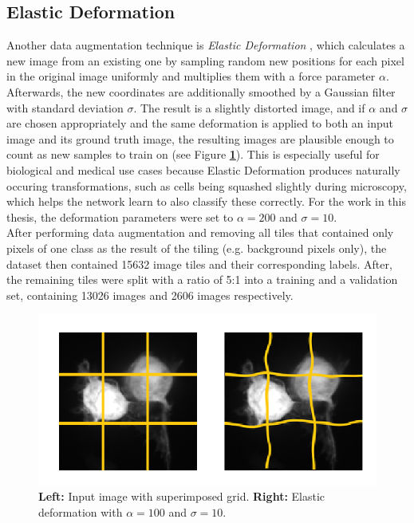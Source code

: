 		\subsection{Elastic Deformation}
Another data augmentation technique is \textit{Elastic Deformation} \cite{elastic}, which calculates a new image from an existing one by sampling random new positions for each pixel in the original image uniformly and multiplies them with a force parameter $\alpha$. Afterwards, the new coordinates are additionally smoothed by a Gaussian filter with standard deviation $\sigma$. The result is a slightly distorted image, and if $\alpha$ and $\sigma$ are chosen appropriately and the same deformation is applied to both an input image and its ground truth image, the resulting images are plausible enough to count as new samples to train on (see Figure \textbf{\ref{fig:elastic}}). This is especially useful for biological and medical use cases because Elastic Deformation produces naturally occuring transformations, such as cells being squashed slightly during microscopy, which helps the network learn to also classify these correctly. For the work in this thesis, the deformation parameters were set to $\alpha = 200$ and $\sigma = 10$.\\

\noindent After performing data augmentation and removing all tiles that contained only pixels of one class as the result of the tiling (e.g. background pixels only), the dataset then contained 15632 image tiles and their corresponding labels. After, the remaining tiles were split with a ratio of 5:1 into a training and a validation set, containing 13026 images and 2606 images respectively.



\begin {figure}[!ht]
	\begin{center}
		\includegraphics[scale=0.80]{img/fig_elastic.png}
	\end{center}
	\caption[Elastic deformation.]{\textbf{Left:} Input image with superimposed grid. \textbf{Right:} Elastic deformation with $\alpha = 100$ and $\sigma = 10$.}
	\label{fig:elastic}
\end {figure}


